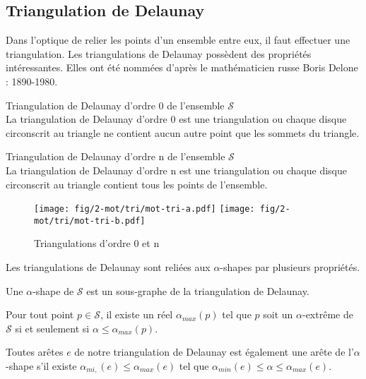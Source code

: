 \subsection{Triangulation de Delaunay}

Dans l'optique de relier les points d'un ensemble entre eux, il faut effectuer une triangulation. Les triangulations de Delaunay possèdent des propriétés intéressantes.  Elles ont été nommées d'après le mathématicien russe Boris Delone : 1890-1980.

\begin{Definition}{Triangulation de Delaunay d'ordre 0 de l'ensemble $\mathcal{S}$}\\
\label{def:tri-del-0}
  La triangulation de Delaunay d'ordre 0 est une triangulation ou chaque disque circonscrit au triangle ne contient aucun autre point que les sommets du triangle.
\end{Definition}

\begin{Definition}{Triangulation de Delaunay d'ordre n de l'ensemble $\mathcal{S}$}\\
\label{def:tri-del-n}
  La triangulation de Delaunay d'ordre n est une triangulation ou chaque disque circonscrit au triangle contient tous les points de l'ensemble.
\end{Definition}

\begin{figure}[H]
  \centering
  \texttt{[image: fig/2-mot/tri/mot-tri-a.pdf]}
  \texttt{[image: fig/2-mot/tri/mot-tri-b.pdf]}
  \caption{Triangulations d'ordre 0 et n}
\end{figure}


Les triangulations de Delaunay sont reliées aux $\alpha$-shapes par plusieurs propriétés. \cite{EdeKirSei83}

\begin{Lemma}
  Une $\alpha$-shape de $\mathcal{S}$ est un sous-graphe de la triangulation de Delaunay.
\end{Lemma}

\begin{Lemma}
  Pour tout point $p \in \mathcal{S}$, il existe un réel $\alpha_{max}(p)$ tel que $p$ soit un $\alpha$-extrême de $\mathcal{S}$ si et seulement si $\alpha \leq \alpha_{max}(p)$.
\end{Lemma}

\begin{Lemma}
  Toutes arêtes $e$ de notre triangulation de Delaunay est également une arête de l'$\alpha$-shape s'il existe $\alpha_{mi,}(e) \leq \alpha_{max}(e)$ tel que $\alpha_{min}(e) \leq \alpha \leq \alpha_{max}(e)$.
\end{Lemma}

